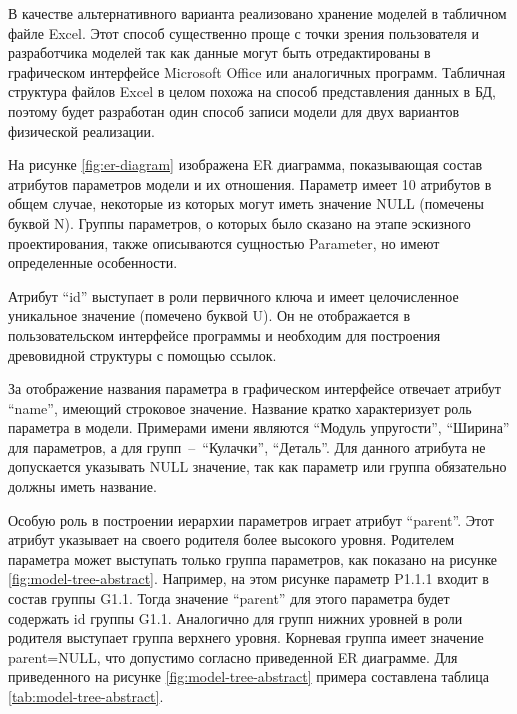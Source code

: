 \documentclass[14pt,oneside,final]{extreport}
\begin{document}
	В качестве альтернативного варианта реализовано хранение моделей в табличном файле Excel. Этот способ существенно проще с точки зрения пользователя и разработчика моделей так как данные могут быть отредактированы в графическом интерфейсе Microsoft Office или аналогичных программ. Табличная структура файлов Excel в целом похожа на способ представления данных в БД, поэтому будет разработан один способ записи модели для двух вариантов физической реализации.
	
	На рисунке \ref{fig:er-diagram} изображена ER диаграмма, показывающая состав атрибутов параметров модели и их отношения. Параметр имеет 10 атрибутов в общем случае, некоторые из которых могут иметь значение NULL (помечены буквой N). Группы параметров, о которых было сказано на этапе эскизного проектирования, также описываются сущностью Parameter, но имеют определенные особенности. 
	
	Атрибут ``id'' выступает в роли первичного ключа и имеет целочисленное уникальное значение (помечено буквой U). Он не отображается в пользовательском интерфейсе программы и необходим для построения древовидной структуры с помощью ссылок. 
	
	За отображение названия параметра в графическом интерфейсе отвечает атрибут ``name'', имеющий строковое значение. Название кратко характеризует роль параметра в модели. Примерами имени являются ``Модуль упругости'',  ``Ширина'' для параметров, а для групп~--~``Кулачки'', ``Деталь''. Для данного атрибута не допускается указывать NULL значение, так как параметр или группа обязательно должны иметь название.

	Особую роль в построении иерархии параметров играет атрибут ``parent''. Этот атрибут указывает на своего родителя более высокого уровня. Родителем параметра может выступать только группа параметров, как показано на рисунке \ref{fig:model-tree-abstract}. Например, на этом рисунке параметр P1.1.1 входит в состав группы G1.1. Тогда значение ``parent'' для этого параметра будет содержать id группы G1.1. Аналогично для групп нижних уровней в роли родителя выступает группа верхнего уровня. Корневая группа имеет значение parent=NULL, что допустимо согласно приведенной ER диаграмме. Для приведенного на рисунке \ref{fig:model-tree-abstract} примера составлена таблица \ref{tab:model-tree-abstract}.
		
\end{document}
